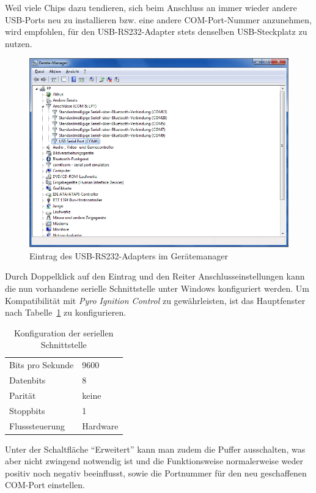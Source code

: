 \documentclass[pdftex, parskip, numbers=noenddot, toc=listof]{scrbook}
\newcommand{\pic}{\emph{Pyro Ignition Control}}
\begin{document}
	Weil viele Chips dazu tendieren, sich beim Anschluss an immer wieder andere USB-Ports neu zu installieren bzw. eine andere COM-Port-Nummer anzunehmen, wird empfohlen, für den USB-RS232-Adapter stets denselben USB-Steckplatz zu nutzen.

	\begin{figure}
		\centering
		\includegraphics[width=.9\textwidth]{Bilder/geraetemanager}
		\caption{Eintrag des USB-RS232-Adapters im Gerätemanager}
		\label{fig:geraetemanager}
	\end{figure}

	Durch Doppelklick auf den Eintrag und den Reiter Anschlusseinstellungen kann die nun vorhandene serielle Schnittstelle unter Windows konfiguriert werden. Um Kompatibilität mit {\pic} zu gewährleisten, ist das Hauptfenster nach Tabelle~\ref{tab:seriell} zu konfigurieren.

	\begin{table}[b]
		\begin{center}
			\begin{tabularx}{7cm}{Xl}
				\hline
				Bits pro Sekunde & 9600     \\
				Datenbits        & 8        \\
				Parität         & keine    \\
				Stoppbits        & 1        \\
				Flusssteuerung   & Hardware \\ \hline
			\end{tabularx}
			\caption{Konfiguration der seriellen Schnittstelle}
			\label{tab:seriell}
		\end{center}
	\end{table}

	Unter der Schaltfläche \enquote{Erweitert} kann man zudem die Puffer ausschalten, was aber nicht zwingend notwendig ist und die Funktionsweise normalerweise weder positiv noch negativ beeinflusst, sowie die Portnummer für den neu geschaffenen COM-Port einstellen.
\end{document}
